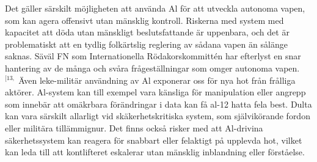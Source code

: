 {{{{{{{{Det gäller särskilt möjligheten att använda Al för att utveckla autonoma vapen, som kan agera offensivt utan mänsklig kontroll. Riskerna med system med kapacitet att döda utan mänskligt beslutsfattande är uppenbara, och det är problematiskt att en tydlig folkärtslig reglering av sådana vapen än sålänge saknas. Säväl FN som Internationella Rödakorskommittén har efterlyst en snar hantering av de många och svåra frågeställningar som omger autonoma vapen. \({ }^{[13,}\)
Även leke-militär användning av Al exponerar oss för nya hot från frålliga aktörer. Al-system kan till exempel vara känsliga för manipulation eller angrepp som innebär att omäkrbara förändringar i data kan få al-12 hatta fela best. Dulta kan vara särskilt allarligt vid skäkerhetskritiska system, som självikörande fordon eller militära tillämmignur. Det finns också risker med att Al-drivina säkerhetssystem kan reagera för snabbart eller felaktigt på upplevda hot, vilket kan leda till att kontlifteret eskalerar utan mänsklig inblandning eller förståelse.
}}}}}}}}
